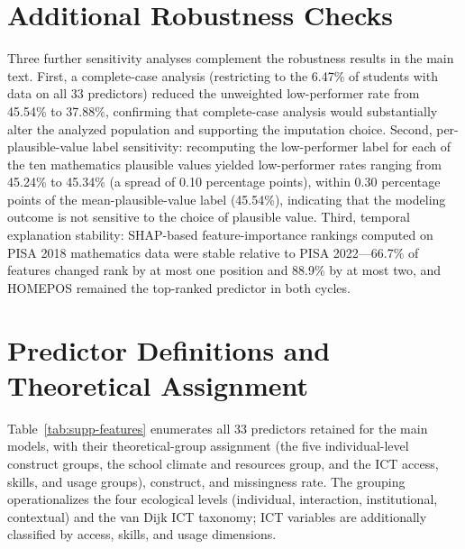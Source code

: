 \documentclass[journal]{IEEEtran}
\begin{document}


\section{Additional Robustness Checks}
\label{sec:s4}

Three further sensitivity analyses complement the robustness results in the main text. First, a complete-case analysis (restricting to the 6.47\% of students with data on all 33 predictors) reduced the unweighted low-performer rate from 45.54\% to 37.88\%, confirming that complete-case analysis would substantially alter the analyzed population and supporting the imputation choice. Second, per-plausible-value label sensitivity: recomputing the low-performer label for each of the ten mathematics plausible values yielded low-performer rates ranging from 45.24\% to 45.34\% (a spread of 0.10 percentage points), within 0.30 percentage points of the mean-plausible-value label (45.54\%), indicating that the modeling outcome is not sensitive to the choice of plausible value. Third, temporal explanation stability: SHAP-based feature-importance rankings computed on PISA 2018 mathematics data were stable relative to PISA 2022---66.7\% of features changed rank by at most one position and 88.9\% by at most two, and HOMEPOS remained the top-ranked predictor in both cycles.

\section{Predictor Definitions and Theoretical Assignment}
\label{sec:s5}

Table~\ref{tab:supp-features} enumerates all 33 predictors retained for the main models, with their theoretical-group assignment (the five individual-level construct groups, the school climate and resources group, and the ICT access, skills, and usage groups), construct, and missingness rate. The grouping operationalizes the four ecological levels (individual, interaction, institutional, contextual) and the van Dijk ICT taxonomy; ICT variables are additionally classified by access, skills, and usage dimensions.
\end{document}
